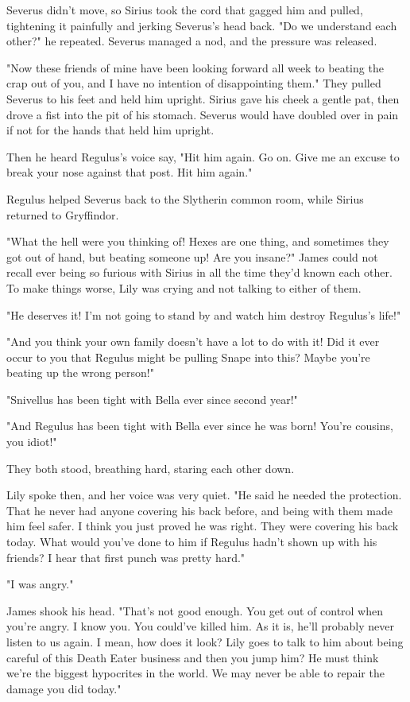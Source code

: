 Severus didn't move, so Sirius took the cord that gagged him and pulled, tightening it painfully and jerking Severus's head back. "Do we understand each other?" he repeated. Severus managed a nod, and the pressure was released.

"Now these friends of mine have been looking forward all week to beating the crap out of you, and I have no intention of disappointing them." They pulled Severus to his feet and held him upright. Sirius gave his cheek a gentle pat, then drove a fist into the pit of his stomach. Severus would have doubled over in pain if not for the hands that held him upright.

Then he heard Regulus's voice say, "Hit him again. Go on. Give me an excuse to break your nose against that post. Hit him again."

Regulus helped Severus back to the Slytherin common room, while Sirius returned to Gryffindor.

"What the hell were you thinking of! Hexes are one thing, and sometimes they got out of hand, but beating someone up! Are you insane?" James could not recall ever being so furious with Sirius in all the time they'd known each other. To make things worse, Lily was crying and not talking to either of them.

"He deserves it! I'm not going to stand by and watch him destroy Regulus's life!"

"And you think your own family doesn't have a lot to do with it! Did it ever occur to you that Regulus might be pulling Snape into this? Maybe you're beating up the wrong person!"

"Snivellus has been tight with Bella ever since second year!"

"And Regulus has been tight with Bella ever since he was born! You're cousins, you idiot!"

They both stood, breathing hard, staring each other down.

Lily spoke then, and her voice was very quiet. "He said he needed the protection. That he never had anyone covering his back before, and being with them made him feel safer. I think you just proved he was right. They were covering his back today. What would you've done to him if Regulus hadn't shown up with his friends? I hear that first punch was pretty hard."

"I was angry."

James shook his head. "That's not good enough. You get out of control when you're angry. I know you. You could've killed him. As it is, he'll probably never listen to us again. I mean, how does it look? Lily goes to talk to him about being careful of this Death Eater business and then you jump him? He must think we're the biggest hypocrites in the world. We may never be able to repair the damage you did today."

